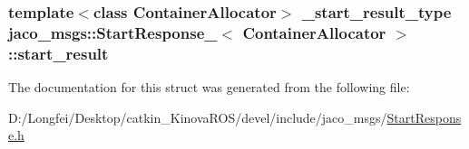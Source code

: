 \subsubsection[{\texorpdfstring{start\+\_\+result}{start_result}}]{\setlength{\rightskip}{0pt plus 5cm}template$<$class Container\+Allocator$>$ {\bf \+\_\+start\+\_\+result\+\_\+type} {\bf jaco\+\_\+msgs\+::\+Start\+Response\+\_\+}$<$ Container\+Allocator $>$\+::start\+\_\+result}\hypertarget{structjaco__msgs_1_1StartResponse___ada6cfbcf90a2ab058b01adf0b079515c}{}\label{structjaco__msgs_1_1StartResponse___ada6cfbcf90a2ab058b01adf0b079515c}


The documentation for this struct was generated from the following file\+:\begin{DoxyCompactItemize}
\item 
D\+:/\+Longfei/\+Desktop/catkin\+\_\+\+Kinova\+R\+O\+S/devel/include/jaco\+\_\+msgs/\hyperlink{StartResponse_8h}{Start\+Response.\+h}\end{DoxyCompactItemize}
